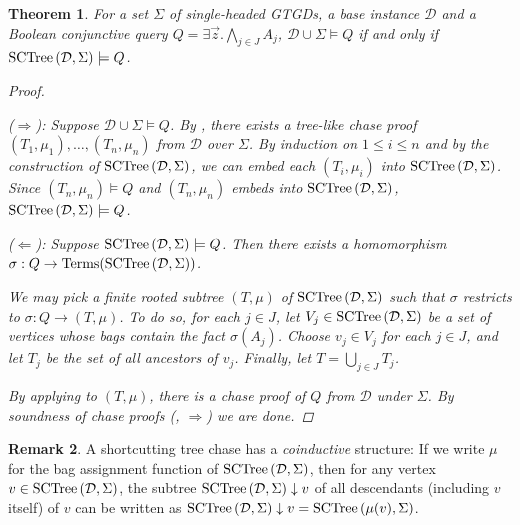 \documentclass[12pt]{report}
\theoremstyle{plain}
\newtheorem{theorem}{Theorem}[chapter]
\theoremstyle{definition}
\newtheorem{remark}[theorem]{Remark}
\def\Terms{{\mathrm{Terms}}}
\newcommand{\SCTree}[2]{\ensuremath{\normalfont{\textrm{SCTree}} \left( #1, #2 \right)}}
\begin{document}
\begin{theorem}
\label{sctree-soundness-completeness}
  For a set $\Sigma$ of single-headed GTGDs, a base instance $\mathcal{D}$ and a Boolean conjunctive query $Q = \exists \vec{z}. \bigwedge_{j \in J} A_j$, $\mathcal{D} \cup \Sigma \models Q$ if and only if $\SCTree{\mathcal{D}}{\Sigma} \models Q$.
  \begin{proof}[Proof] $ $\par
    ($\Longrightarrow$): Suppose $\mathcal{D} \cup \Sigma \models Q$. By , there exists a tree-like chase proof $(T_1, \mu_1), \ldots, (T_n, \mu_n)$ from $\mathcal{D}$ over $\Sigma$. By induction on $1 \leq i \leq n$ and by the construction of $\SCTree{\mathcal{D}}{\Sigma}$, we can embed each $(T_i, \mu_i)$ into $\SCTree{\mathcal{D}}{\Sigma}$. Since $(T_n, \mu_n) \models Q$ and $(T_n, \mu_n)$ embeds into $\SCTree{\mathcal{D}}{\Sigma}$, $\SCTree{\mathcal{D}}{\Sigma} \models Q$.

    ($\Longleftarrow$): Suppose $\SCTree{\mathcal{D}}{\Sigma} \models Q$. Then there exists a homomorphism $\sigma:\nobreak Q \rightarrow \Terms(\SCTree{\mathcal{D}}{\Sigma})$.
    
    We may pick a finite rooted subtree $(T, \mu)$ of $\SCTree{\mathcal{D}}{\Sigma}$ such that $\sigma$ restricts to $\sigma: Q \rightarrow (T, \mu)$. To do so, for each $j \in J$, let $V_j \in \SCTree{\mathcal{D}}{\Sigma}$ be a set of vertices whose bags contain the fact $\sigma(A_j)$. Choose $v_j \in V_j$ for each $j \in J$, and let $T_j$ be the set of all ancestors of $v_j$. Finally, let $T = \bigcup_{j \in J} T_j$.

    By applying  to $(T, \mu)$, there is a chase proof of $Q$ from $\mathcal{D}$ under $\Sigma$. By soundness of chase proofs (, $\Longrightarrow$) we are done.
  \end{proof}
\end{theorem}

\begin{remark}
\label{coinductiveness-of-sctree}
  A shortcutting tree chase has a \emph{coinductive} structure: If we write $\mu$ for the bag assignment function of $\SCTree{\mathcal{D}}{\Sigma}$, then for any vertex $v \in \SCTree{\mathcal{D}}{\Sigma}$, the subtree $\SCTree{\mathcal{D}}{\Sigma} \downarrow v$ of all descendants (including $v$ itself) of $v$ can be written as $\SCTree{\mathcal{D}}{\Sigma} \downarrow v = \SCTree{\mu(v)}{\Sigma}$.
\end{remark}
\end{document}

